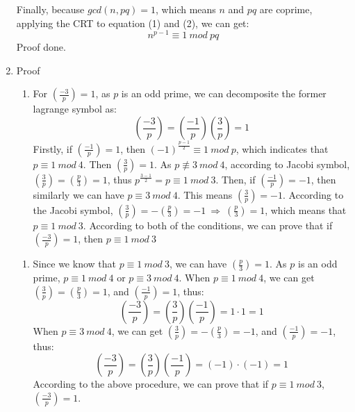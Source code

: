 \documentclass[12pt, a4paper]{article}
\begin{document}
\begin{enumerate}
          Finally, because $gcd(n,pq) = 1$, which means $n$ and $pq$ are coprime, 
          applying the CRT to equation (1) and (2), we can get:
          $$n^{p-1} \equiv 1\ mod\ pq$$
          Proof done.
    \item Proof
          \begin{enumerate}[($\Rightarrow$)]
              \item For $(\frac{-3}{p}) = 1$, as $p$ is an odd prime, we can decomposite the former lagrange symbol as:
                    $$(\frac{-3}{p}) = (\frac{-1}{p})(\frac{3}{p}) = 1$$
                    Firstly, if $(\frac{-1}{p}) = 1$, then $(-1)^{\frac{p-1}{2}} \equiv 1\ mod\ p$, 
                    which indicates that $p \equiv 1\ mod\ 4$. Then $(\frac{3}{p}) = 1$. 
                    As $p \not\equiv 3\ mod\ 4$, according to Jacobi symbol, 
                    $(\frac{3}{p}) = (\frac{p}{3}) = 1$, thus 
                    $p^{\frac{3-1}{2}} = p \equiv 1\ mod\ 3$. \newline
                    Then, if $(\frac{-1}{p}) = -1$, then similarly we can have 
                    $p \equiv 3\ mod\ 4$. This means $(\frac{3}{p}) = -1$. According to the Jacobi symbol, 
                    $(\frac{3}{p}) = -(\frac{p}{3}) = -1\ \Rightarrow \ (\frac{p}{3}) = 1$, 
                    which means that $p \equiv 1\ mod\ 3$.\newline
                    According to both of the conditions, we can prove that 
                    if $(\frac{-3}{p}) = 1$, then $p \equiv 1\ mod\ 3$ 
          \end{enumerate}
          \begin{enumerate}[($\Leftarrow$)]
              \item Since we know that $p \equiv 1\ mod\ 3$, we can have $(\frac{p}{3}) = 1$.\newline
                    As $p$ is an odd prime, $p \equiv 1\ mod\ 4$ or $p \equiv 3\ mod\ 4$.\newline
                    When $p \equiv 1\ mod\ 4$, we can get $(\frac{3}{p}) = (\frac{p}{3}) = 1$, 
                    and $(\frac{-1}{p}) = 1$, thus:
                    $$(\frac{-3}{p}) = (\frac{3}{p})(\frac{-1}{p}) = 1\cdot 1 = 1$$
                    When $p \equiv 3\ mod\ 4$, we can get $(\frac{3}{p}) = -(\frac{p}{3}) = -1$, 
                    and $(\frac{-1}{p}) = -1$, thus:
                    $$(\frac{-3}{p}) = (\frac{3}{p})(\frac{-1}{p}) = (-1)\cdot (-1) = 1$$
                    According to the above procedure, we can prove that 
                    if $p \equiv 1\ mod\ 3$, $(\frac{-3}{p}) = 1$.

\end{enumerate}
\end{enumerate}
\end{document}
